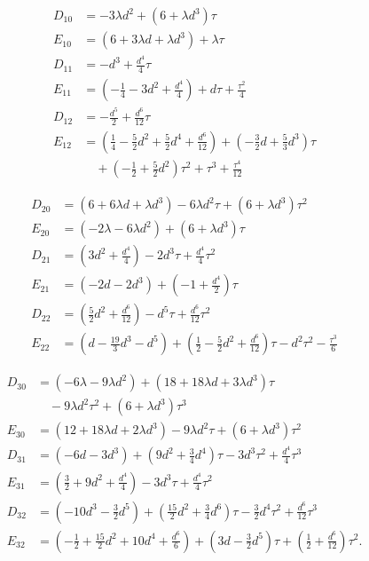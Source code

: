 \[
\begin{aligned}
D_{10} &= -3\lambda d^{2} + \left(6 + \lambda d^{3}\right)\tau \\
E_{10} &= \left(6 + 3\lambda d + \lambda d^{3}\right) + \lambda\tau \\
D_{11} &= -d^{3} + \frac{d^{4}}{4}\tau \\
E_{11} &= \left(-\tfrac{1}{4} - 3d^{2} + \tfrac{d^{4}}{4}\right) + d\tau + \frac{\tau^{2}}{4} \\
D_{12} &= -\frac{d^{5}}{2} + \frac{d^{6}}{12}\tau \\
E_{12} &= \left(\tfrac{1}{4} - \tfrac{5}{2}d^{2} + \tfrac{5}{2}d^{4} + \tfrac{d^{6}}{12}\right) + \left(-\tfrac{3}{2}d + \tfrac{5}{3}d^{3}\right)\tau \\
&\quad + \left(-\tfrac{1}{2} + \tfrac{5}{2}d^{2}\right)\tau^{2} + \tau^{3} + \frac{\tau^{4}}{12}
\end{aligned}
\tag{29}
\]

\[
\begin{aligned}
D_{20} &= \left(6 + 6\lambda d + \lambda d^{3}\right) - 6\lambda d^{2}\tau + \left(6 + \lambda d^{3}\right)\tau^{2} \\
E_{20} &= \left(-2\lambda - 6\lambda d^{2}\right) + \left(6 + \lambda d^{3}\right)\tau \\
D_{21} &= \left(3d^{2} + \tfrac{d^{4}}{4}\right) - 2d^{3}\tau + \tfrac{d^{4}}{4}\tau^{2} \\
E_{21} &= \left(-2d - 2d^{3}\right) + \left(-1 + \tfrac{d^{4}}{2}\right)\tau \\
D_{22} &= \left(\tfrac{5}{2}d^{2} + \tfrac{d^{6}}{12}\right) - d^{5}\tau + \tfrac{d^{6}}{12}\tau^{2} \\
E_{22} &= \left(d - \tfrac{19}{3}d^{3} - d^{5}\right) + \left(\tfrac{1}{2} - \tfrac{5}{2}d^{2} + \tfrac{d^{6}}{12}\right)\tau - d^{2}\tau^{2} - \frac{\tau^{3}}{6}
\end{aligned}
\tag{30}
\]

\[
\begin{aligned}
D_{30} &= \left(-6\lambda - 9\lambda d^{2}\right) + \left(18 + 18\lambda d + 3\lambda d^{3}\right)\tau \\
&\quad - 9\lambda d^{2}\tau^{2} + \left(6 + \lambda d^{3}\right)\tau^{3} \\
E_{30} &= \left(12 + 18\lambda d + 2\lambda d^{3}\right) - 9\lambda d^{2}\tau + \left(6 + \lambda d^{3}\right)\tau^{2} \\
D_{31} &= \left(-6d - 3d^{3}\right) + \left(9d^{2} + \tfrac{3}{4}d^{4}\right)\tau - 3d^{3}\tau^{2} + \frac{d^{4}}{4}\tau^{3} \\
E_{31} &= \left(\tfrac{3}{2} + 9d^{2} + \tfrac{d^{4}}{4}\right) - 3d^{3}\tau + \tfrac{d^{4}}{4}\tau^{2} \\
D_{32} &= \left(-10d^{3} - \tfrac{3}{2}d^{5}\right) + \left(\tfrac{15}{2}d^{2} + \tfrac{3}{4}d^{6}\right)\tau - \tfrac{3}{2}d^{4}\tau^{2} + \frac{d^{6}}{12}\tau^{3} \\
E_{32} &= \left(-\tfrac{1}{2} + \tfrac{15}{2}d^{2} + 10d^{4} + \tfrac{d^{6}}{6}\right) + \left(3d - \tfrac{3}{2}d^{5}\right)\tau + \left(\tfrac{1}{2} + \tfrac{d^{6}}{12}\right)\tau^{2}.
\end{aligned}
\tag{31}
\]

